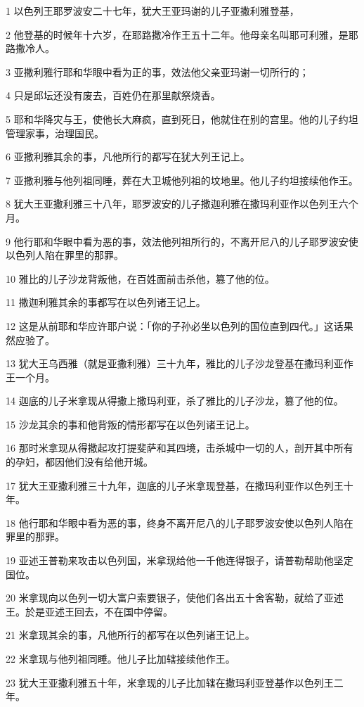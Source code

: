 \par 1 以色列王耶罗波安二十七年，犹大王亚玛谢的儿子亚撒利雅登基，
\par 2 他登基的时候年十六岁，在耶路撒冷作王五十二年。他母亲名叫耶可利雅，是耶路撒冷人。
\par 3 亚撒利雅行耶和华眼中看为正的事，效法他父亲亚玛谢一切所行的；
\par 4 只是邱坛还没有废去，百姓仍在那里献祭烧香。
\par 5 耶和华降灾与王，使他长大麻疯，直到死日，他就住在别的宫里。他的儿子约坦管理家事，治理国民。
\par 6 亚撒利雅其余的事，凡他所行的都写在犹大列王记上。
\par 7 亚撒利雅与他列祖同睡，葬在大卫城他列祖的坟地里。他儿子约坦接续他作王。
\par 8 犹大王亚撒利雅三十八年，耶罗波安的儿子撒迦利雅在撒玛利亚作以色列王六个月。
\par 9 他行耶和华眼中看为恶的事，效法他列祖所行的，不离开尼八的儿子耶罗波安使以色列人陷在罪里的那罪。
\par 10 雅比的儿子沙龙背叛他，在百姓面前击杀他，篡了他的位。
\par 11 撒迦利雅其余的事都写在以色列诸王记上。
\par 12 这是从前耶和华应许耶户说：「你的子孙必坐以色列的国位直到四代。」这话果然应验了。
\par 13 犹大王乌西雅（就是亚撒利雅）三十九年，雅比的儿子沙龙登基在撒玛利亚作王一个月。
\par 14 迦底的儿子米拿现从得撒上撒玛利亚，杀了雅比的儿子沙龙，篡了他的位。
\par 15 沙龙其余的事和他背叛的情形都写在以色列诸王记上。
\par 16 那时米拿现从得撒起攻打提斐萨和其四境，击杀城中一切的人，剖开其中所有的孕妇，都因他们没有给他开城。
\par 17 犹大王亚撒利雅三十九年，迦底的儿子米拿现登基，在撒玛利亚作以色列王十年。
\par 18 他行耶和华眼中看为恶的事，终身不离开尼八的儿子耶罗波安使以色列人陷在罪里的那罪。
\par 19 亚述王普勒来攻击以色列国，米拿现给他一千他连得银子，请普勒帮助他坚定国位。
\par 20 米拿现向以色列一切大富户索要银子，使他们各出五十舍客勒，就给了亚述王。於是亚述王回去，不在国中停留。
\par 21 米拿现其余的事，凡他所行的都写在以色列诸王记上。
\par 22 米拿现与他列祖同睡。他儿子比加辖接续他作王。
\par 23 犹大王亚撒利雅五十年，米拿现的儿子比加辖在撒玛利亚登基作以色列王二年。
